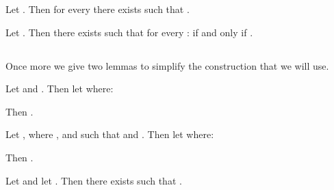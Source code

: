 \documentclass[twoside]{aiml14}
\begin{document}
  \begin{corollary}
      Let .
      Then for every 
      there exists  
      such that .
  \end{corollary}

  \begin{corollary}
      Let . 
      Then there exists  
      such that for every : 
       if and only if
      .
  \end{corollary}

  \subsection{\classS{}}

  Once more we give two lemmas to simplify the construction that we will use.

  \begin{lemma}\label{afl-s-construction-test}
      Let  and 
      .
      Then let  where:
      
      Then .
  \end{lemma}

  \begin{lemma}\label{afl-s-construction-learning}
      Let ,
       where ,
      and  
      such that  
      and .
      Then let  where:
      
      Then .
  \end{lemma}

  \begin{proposition}\label{afl-s-correspondence}
      Let  and 
      let . 
      Then there exists  such that 
      .
  \end{proposition}
\end{document}
